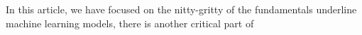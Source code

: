 In this article, we have focused on the nitty-gritty of the fundamentals underline machine learning models, there is another critical part of  
